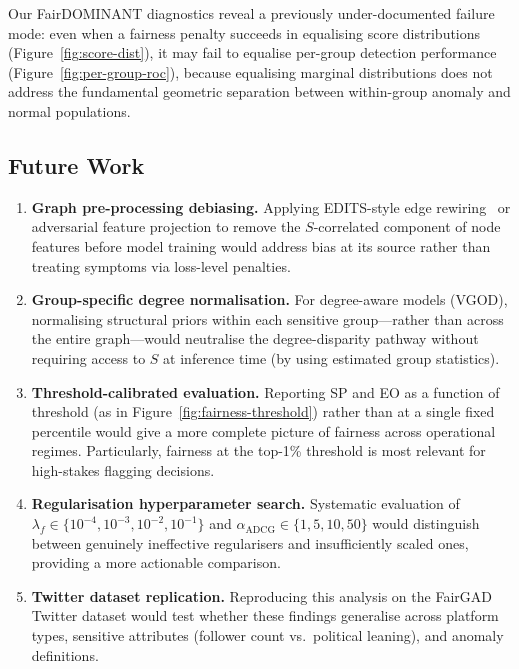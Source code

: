 \documentclass[sigconf,natbib=false]{acmart}
\begin{document}
Our FairDOMINANT diagnostics reveal a previously under-documented failure mode: even when a fairness penalty succeeds in equalising score distributions (Figure~\ref{fig:score-dist}), it may fail to equalise per-group detection performance (Figure~\ref{fig:per-group-roc}), because equalising marginal distributions does not address the fundamental geometric separation between within-group anomaly and normal populations.

\subsection{Future Work}

\begin{enumerate}[leftmargin=*]
    \item \textbf{Graph pre-processing debiasing.} Applying EDITS-style edge rewiring~\cite{dong2022edits} or adversarial feature projection to remove the $S$-correlated component of node features before model training would address bias at its source rather than treating symptoms via loss-level penalties.

    \item \textbf{Group-specific degree normalisation.} For degree-aware models (VGOD), normalising structural priors within each sensitive group—rather than across the entire graph—would neutralise the degree-disparity pathway without requiring access to $S$ at inference time (by using estimated group statistics).

    \item \textbf{Threshold-calibrated evaluation.} Reporting SP and EO as a function of threshold (as in Figure~\ref{fig:fairness-threshold}) rather than at a single fixed percentile would give a more complete picture of fairness across operational regimes. Particularly, fairness at the top-1\% threshold is most relevant for high-stakes flagging decisions.

    \item \textbf{Regularisation hyperparameter search.} Systematic evaluation of $\lambda_f \in \{10^{-4}, 10^{-3}, 10^{-2}, 10^{-1}\}$ and $\alpha_{\text{ADCG}} \in \{1, 5, 10, 50\}$ would distinguish between genuinely ineffective regularisers and insufficiently scaled ones, providing a more actionable comparison.

    \item \textbf{Twitter dataset replication.} Reproducing this analysis on the FairGAD Twitter dataset would test whether these findings generalise across platform types, sensitive attributes (follower count vs.\ political leaning), and anomaly definitions.


\end{enumerate}
\end{document}
